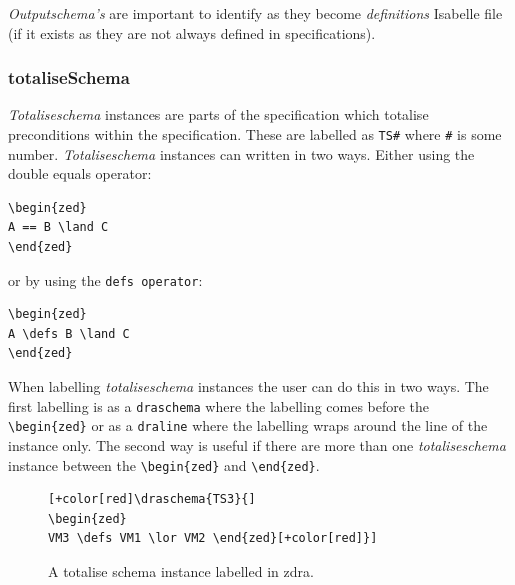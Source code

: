 \emph{Outputschema's} are important to identify as they become \emph{definitions}
Isabelle file (if it exists as they are not always defined in specifications).

\subsubsection{totaliseSchema}

\emph{Totaliseschema} instances are parts of the specification which totalise
preconditions within the specification. These are labelled as
\verb|TS#| where \verb|#| is some number. \emph{Totaliseschema} instances can written
in two ways. Either using the double equals operator:

\begin{verbatim}
\begin{zed}
A == B \land C
\end{zed}
\end{verbatim}

or by using the \verb|defs operator|:

\begin{verbatim}
\begin{zed}
A \defs B \land C
\end{zed}
\end{verbatim}

When labelling \emph{totaliseschema} instances the user can do this in two ways. The
first labelling is as a \verb|draschema| where the labelling comes before the
\verb|\begin{zed}| or as a \verb|draline| where the labelling wraps around the
line of the instance only. The second way is useful if there are more than one
\emph{totaliseschema} instance between the \verb|\begin{zed}| and \verb|\end{zed}|. 

\begin{figure}[H]
\centering
\begin{footnotesize}
\begin{BVerbatim}[commandchars=+\[\]]
[+color[red]\draschema{TS3}{]
\begin{zed}
VM3 \defs VM1 \lor VM2 \end{zed}[+color[red]}]
\end{BVerbatim}
\end{footnotesize}
\caption{\label{fig:exampleofts1} A totalise schema instance labelled in \gls{zdra}.}
\end{figure}


